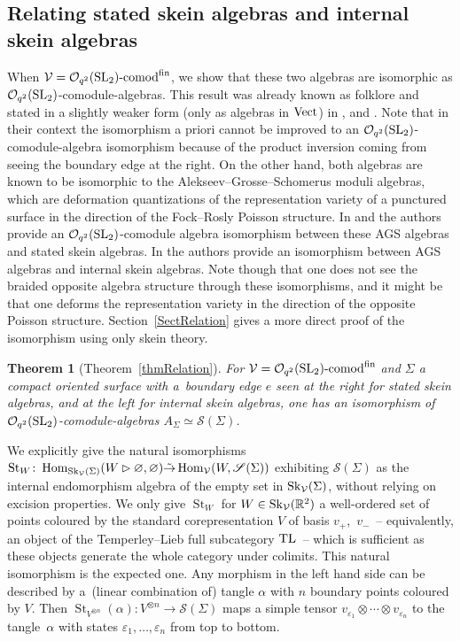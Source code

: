 \documentclass[pdftex]{sigma}%
\numberwithin{equation}{section}
\newtheorem{Theorem}{Theorem}[section]
\newcommand{\St}{\operatorname{St}}
\newcommand{\Hom}{\operatorname{Hom}}
\newcommand{\Oqcomfin}{\Oq\text{-}{\rm comod}^{\rm fin}}
\newcommand{\Oq}{\mathcal{O}_{q^2}({\rm SL}_2)}
\begin{document}
\subsection*{Relating stated skein algebras and internal skein algebras} When $\mathcal{V} = \Oqcomfin$, we show that these two algebras are isomorphic as $\Oq$-comodule-algebras. This result was already known as folklore and stated in a slightly weaker form (only as algebras in $\rm Vect$) in \cite[Theorem~4.4]{LeYu}, \cite[Theorem~9.1]{LeSikora} and \cite[Remark 2.21]{Gunningham}. Note that in their context the isomorphism a priori cannot be improved to an $\Oq$-comodule-algebra isomorphism because of the product inversion coming from seeing the boundary edge at the right. On the other hand, both algebras are known to be isomorphic to the Alekseev--Grosse--Schomerus moduli algebras, which are deformation quantizations of the representation variety of a punctured surface in the direction of the Fock--Rosly Poisson structure. In \cite[Theorem~5.3]{Faitg} and \cite{Korinman} the authors provide an $\Oq$-comodule algebra isomorphism between these AGS algebras and stated skein algebras. In \cite[Section~7]{BBJ} the authors provide an isomorphism between AGS algebras and internal skein algebras. Note though that one does not see the braided opposite algebra structure through these isomorphisms, and it might be that one deforms the representation variety in the direction of the opposite Poisson structure. Section~\ref{SectRelation} gives a more direct proof of the isomorphism using only skein theory.
\begin{Theorem}[Theorem~\ref{thmRelation}]
For $\mathcal{V} = \Oqcomfin$ and $\Sigma$ a compact oriented surface with a~boundary edge $e$ seen at the right for stated skein algebras, and at the left for internal skein algebras, one has an isomorphism of $\Oq$-comodule-algebras $A_\Sigma \simeq \mathscr{S}(\Sigma)$.
\end{Theorem}
We explicitly give the natural isomorphisms $\St_W\colon\Hom_{{\rm Sk}_\mathcal{V}(\Sigma)}(W\rhd\varnothing,\varnothing) \tilde{\to} \Hom_{\mathcal{V}}(W,\mathscr{S}(\Sigma))$ exhi\-bi\-ting $\mathscr{S}(\Sigma)$ as the internal endomorphism algebra of the empty set in ${\rm Sk}_\mathcal{V}(\Sigma)$, without relying on excision properties. We only give $\St_W$ for $W\in {\rm Sk}_\mathcal{V}(\mathbb{R}^2)$ a well-ordered set of points coloured by the standard corepresentation $V$ of basis $v_+$,~$v_-$~-- equivalently, an object of the Temperley--Lieb full subcategory ${\rm TL}$~-- which is sufficient as these objects generate the whole category under colimits. This natural isomorphism is the expected one. Any morphism in the left hand side can be described by a~(linear combination of) tangle $\alpha$ with $n$ boundary points coloured by $V$. Then $\St_{V^{\otimes n}}(\alpha)\colon V^{\otimes n} \to \mathscr{S}(\Sigma)$ maps a simple tensor $v_{\varepsilon_1}\otimes\cdots \otimes v_{\varepsilon_n}$ to the tangle~$\alpha$ with states $\varepsilon_1,\dots,\varepsilon_n$ from top to bottom.
\end{document}
